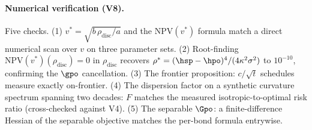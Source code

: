 \paragraph{Numerical verification (V8).}
Five checks. (1) $v^{*} = \sqrt{b\,\rho_{\mathrm{disc}}/a}$ and the
$\mathrm{NPV}(v^{*})$ formula match a direct numerical scan over $v$ on
three parameter sets. (2) Root-finding
$\mathrm{NPV}(v^{*})(\rho_{\mathrm{disc}}) = 0$ in $\rho_{\mathrm{disc}}$
recovers $\rho^{*} = (\hsp-\hpo)^4/(4\kappa^2\sigma^2)$ to $10^{-10}$,
confirming the $\gpo$ cancellation. (3) The frontier proposition:
$c/\sqrt{t}$ schedules measure exactly on-frontier. (4) The dispersion
factor on a synthetic curvature spectrum spanning two decades: $F$
matches the measured isotropic-to-optimal risk ratio (cross-checked
against V4). (5) The separable $\Gpo$: a finite-difference Hessian of
the separable objective matches the per-bond formula entrywise.
